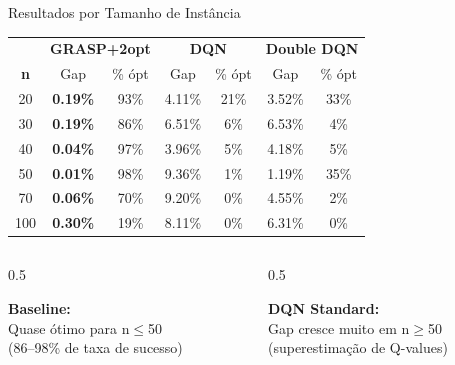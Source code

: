 \documentclass[11pt, xcolor=dvipsnames]{beamer}
\newcommand{\destaque}[1]{\textbf{\textcolor{verde}{#1}}}
\begin{document}
\begin{frame}{Resultados por Tamanho de Instância}
  \footnotesize
  \centering
  \renewcommand{\arraystretch}{1.2}
  \begin{tabular}{c|cc|cc|cc}
    \toprule
    & \multicolumn{2}{c|}{\textbf{GRASP+2opt}} & \multicolumn{2}{c|}{\textbf{DQN}} & \multicolumn{2}{c}{\textbf{Double DQN}} \\
    \textbf{n} & Gap & \% ópt & Gap & \% ópt & Gap & \% ópt \\
    \midrule
    20  & \destaque{0.19\%} & 93\% & 4.11\% & 21\% & 3.52\% & 33\% \\
    30  & \destaque{0.19\%} & 86\% & 6.51\% & 6\%  & 6.53\% & 4\%  \\
    40  & \destaque{0.04\%} & 97\% & 3.96\% & 5\%  & 4.18\% & 5\%  \\
    50  & \destaque{0.01\%} & 98\% & 9.36\% & 1\%  & 1.19\% & 35\% \\
    70  & \destaque{0.06\%} & 70\% & 9.20\% & 0\%  & 4.55\% & 2\%  \\
    100 & \destaque{0.30\%} & 19\% & 8.11\% & 0\%  & 6.31\% & 0\%  \\
    \bottomrule
  \end{tabular}

  \vspace{3mm}
  \begin{columns}[T]
    \begin{column}{0.5\textwidth}
      \begin{calloutbox}
        {\scriptsize
        \textbf{Baseline:} \\
        Quase ótimo para n$\leq$50 \\
        (86--98\% de taxa de sucesso)
        }
      \end{calloutbox}
    \end{column}
    \begin{column}{0.5\textwidth}
      \begin{alertbox}
        {\scriptsize
        \textbf{DQN Standard:} \\
        Gap cresce muito em n$\geq$50 \\
        (superestimação de Q-values)
        }
      \end{alertbox}
    \end{column}
  \end{columns}
\end{frame}
\end{document}
